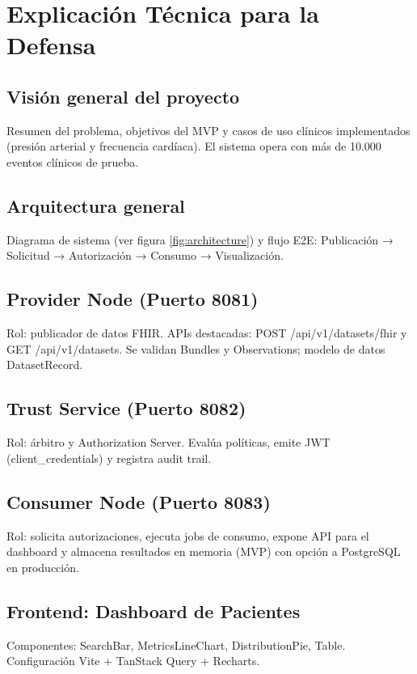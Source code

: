 \chapter{Explicación Técnica para la Defensa}
\label{ch:defensa}

\section{Visión general del proyecto}
Resumen del problema, objetivos del MVP y casos de uso clínicos implementados (presión arterial y frecuencia cardíaca). El sistema opera con más de 10.000 eventos clínicos de prueba.

\section{Arquitectura general}
Diagrama de sistema (ver figura \ref{fig:architecture}) y flujo E2E: Publicación → Solicitud → Autorización → Consumo → Visualización.

\section{Provider Node (Puerto 8081)}
Rol: publicador de datos FHIR. APIs destacadas: POST /api/v1/datasets/fhir y GET /api/v1/datasets. Se validan Bundles y Observations; modelo de datos DatasetRecord.

\section{Trust Service (Puerto 8082)}
Rol: árbitro y Authorization Server. Evalúa políticas, emite JWT (client_credentials) y registra audit trail.

\section{Consumer Node (Puerto 8083)}
Rol: solicita autorizaciones, ejecuta jobs de consumo, expone API para el dashboard y almacena resultados en memoria (MVP) con opción a PostgreSQL en producción.

\section{Frontend: Dashboard de Pacientes}
Componentes: SearchBar, MetricsLineChart, DistributionPie, Table. Configuración Vite + TanStack Query + Recharts.


